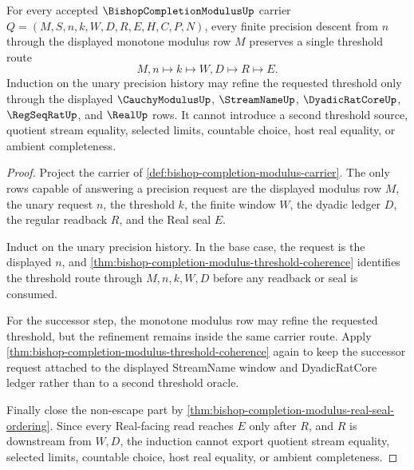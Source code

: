 \begin{theorem}
\label{thm:bishop-completion-modulus-finite-threshold-induction}
For every accepted $\BishopCompletionModulusUp$ carrier $Q=(M,S,n,k,W,D,R,E,H,C,P,N)$, every finite precision descent from $n$ through the displayed monotone modulus row $M$ preserves a single threshold route
$$
M,n \longmapsto k \longmapsto W,D \longmapsto R \longmapsto E .
$$
Induction on the unary precision history may refine the requested threshold only through the displayed $\CauchyModulusUp$, $\StreamNameUp$, $\DyadicRatCoreUp$, $\RegSeqRatUp$, and $\RealUp$ rows. It cannot introduce a second threshold source, quotient stream equality, selected limits, countable choice, host real equality, or ambient completeness.
\end{theorem}
\begin{proof}
Project the carrier of \autoref{def:bishop-completion-modulus-carrier}. The only rows capable of answering a precision request are the displayed modulus row $M$, the unary request $n$, the threshold $k$, the finite window $W$, the dyadic ledger $D$, the regular readback $R$, and the Real seal $E$.

Induct on the unary precision history. In the base case, the request is the displayed $n$, and \autoref{thm:bishop-completion-modulus-threshold-coherence} identifies the threshold route through $M,n,k,W,D$ before any readback or seal is consumed.

For the successor step, the monotone modulus row may refine the requested threshold, but the refinement remains inside the same carrier route. Apply \autoref{thm:bishop-completion-modulus-threshold-coherence} again to keep the successor request attached to the displayed StreamName window and DyadicRatCore ledger rather than to a second threshold oracle.

Finally close the non-escape part by \autoref{thm:bishop-completion-modulus-real-seal-ordering}. Since every Real-facing read reaches $E$ only after $R$, and $R$ is downstream from $W,D$, the induction cannot export quotient stream equality, selected limits, countable choice, host real equality, or ambient completeness.
\end{proof}


